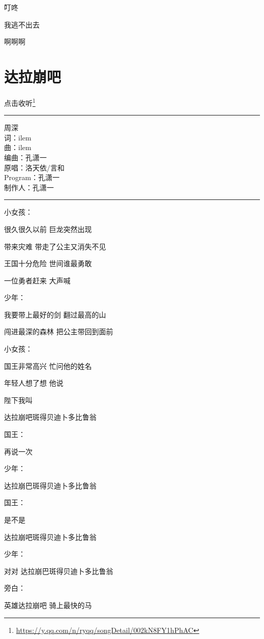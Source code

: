 \documentclass[]{ctexbook}
\renewcommand{\href}[2]{#2\footnote{\url{#1}}}
\begin{document}
叮咚

我逃不出去

啊啊啊

\section*{达拉崩吧}\label{dalabengba}


\href{https://y.qq.com/n/ryqq/songDetail/002kN8FY1hPhAC}{点击收听}

\begin{center}\rule{0.5\linewidth}{0.5pt}\end{center}

周深\\
词：ilem\\
曲：ilem\\
编曲：孔潇一\\
原唱：洛天依/言和\\
Program：孔潇一\\
制作人：孔潇一

\begin{center}\rule{0.5\linewidth}{0.5pt}\end{center}

小女孩：

很久很久以前 巨龙突然出现

带来灾难 带走了公主又消失不见

王国十分危险 世间谁最勇敢

一位勇者赶来 大声喊

少年：

我要带上最好的剑 翻过最高的山

闯进最深的森林 把公主带回到面前

小女孩：

国王非常高兴 忙问他的姓名

年轻人想了想 他说

陛下我叫

达拉崩吧斑得贝迪卜多比鲁翁

国王：

再说一次

少年：

达拉崩巴斑得贝迪卜多比鲁翁

国王：

是不是

达拉崩吧斑得贝迪卜多比鲁翁

少年：

对对 达拉崩巴斑得贝迪卜多比鲁翁

旁白：

英雄达拉崩吧 骑上最快的马
\end{document}
